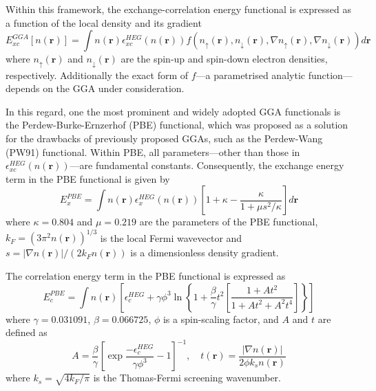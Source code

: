 Within this framework, the exchange-correlation energy functional is expressed as a function of the local density and its gradient 
\begin{equation}
  \label{eq62}
  E_{xc}^{GGA}[n(\mathbf{r})] = \int n(\mathbf{r}) \epsilon_{xc}^{HEG}(n(\mathbf{r})) f(n_{\uparrow}(\mathbf{r}), n_{\downarrow}(\mathbf{r}),\nabla n_{\uparrow}(\mathbf{r}), \nabla n_{\downarrow}(\mathbf{r})) d\mathbf{r}
\end{equation}
where $n_{\uparrow}(\mathbf{r})$ and $n_{\downarrow}(\mathbf{r})$ are the spin-up and spin-down electron densities, respectively. Additionally the exact form of $f$---a parametrised analytic function---depends on the GGA under consideration.  

In this regard, one the most prominent and widely adopted GGA functionals is the Perdew-Burke-Ernzerhof (PBE)\supercite{Perdew1996} functional, which was proposed as a solution for the drawbacks of previously proposed GGAs, such as the Perdew-Wang (PW91) functional. Within PBE, all parameters---other than those in $\epsilon_{xc}^{HEG}(n(\mathbf{r}))$---are fundamental constants. Consequently, the exchange energy term in the PBE functional is given by 
\begin{equation}
  \label{eq63}
  E_{x}^{PBE} = \int n(\mathbf{r}) \epsilon_{x}^{HEG}(n(\mathbf{r})) \left[1 + \kappa - \frac{\kappa}{1 +  \mu s^2/\kappa}\right] d\mathbf{r}
\end{equation}
where $\kappa = 0.804$ and $\mu = 0.219$ are the parameters of the PBE functional, $k_F = (3\pi^2 n(\mathbf{r}))^{1/3}$ is the local Fermi wavevector and $s = |\nabla n(\mathbf{r})|/(2k_F n(\mathbf{r}))$ is a dimensionless density gradient.

The correlation energy term in the PBE functional is expressed as 
\begin{equation}
  \label{eq64}
  E_{c}^{PBE} = \int n(\mathbf{r}) \left[\epsilon_{c}^{HEG} + 
  \gamma \phi^3 \ln\left\{ 1 + \frac{\beta}{\gamma}t^2 
  \left[ 
  \frac{1 + At^2}{1 + At^2 + A^2t^4}
  \right]
  \right\} 
  \right]
\end{equation}
where $\gamma = 0.031091$, $\beta = 0.066725$, $\phi$ is a spin-scaling factor, and $A$ and $t$ are defined as 
\begin{equation}
  \label{eq65}
  A = \frac{\beta}{\gamma} \left[\exp{\frac{-\epsilon_{c}^{HEG}}{\gamma\phi^3}} - 1  \right]^{-1}, \quad 
  t(\mathbf{r}) = \frac{|\nabla n(\mathbf{r})|}{2\phi k_s n(\mathbf{r})}
\end{equation}
where $k_s = \sqrt{4 k_F / \pi}$ is the Thomas-Fermi screening wavenumber.

